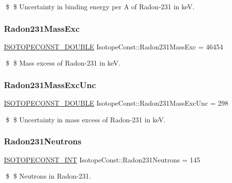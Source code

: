 \$ \$ Uncertainty in binding energy per A of Radon-\/231 in keV. \mbox{\label{group___isotope_const-_radon-_rn231_ga50596ab8955d3dfaba32bcaf6edc9448}} 
\subsubsection{\texorpdfstring{Radon231\+Mass\+Exc}{Radon231MassExc}}
{\footnotesize\ttfamily \mbox{\hyperlink{group___isotope_const-_macros_ga8f45a7272ce02c0b4c65c44636ed719a}{I\+S\+O\+T\+O\+P\+E\+C\+O\+N\+S\+T\+\_\+\+D\+O\+U\+B\+LE}} Isotope\+Const\+::\+Radon231\+Mass\+Exc = 46454}

\$ \$ Mass excess of Radon-\/231 in keV. \mbox{\label{group___isotope_const-_radon-_rn231_ga15a19c8c958a46d086783b2398a66455}} 
\subsubsection{\texorpdfstring{Radon231\+Mass\+Exc\+Unc}{Radon231MassExcUnc}}
{\footnotesize\ttfamily \mbox{\hyperlink{group___isotope_const-_macros_ga8f45a7272ce02c0b4c65c44636ed719a}{I\+S\+O\+T\+O\+P\+E\+C\+O\+N\+S\+T\+\_\+\+D\+O\+U\+B\+LE}} Isotope\+Const\+::\+Radon231\+Mass\+Exc\+Unc = 298}

\$ \$ Uncertainty in mass excess of Radon-\/231 in keV. \mbox{\label{group___isotope_const-_radon-_rn231_ga33d762eff88bda4afc92c20aa36709a9}} 
\subsubsection{\texorpdfstring{Radon231\+Neutrons}{Radon231Neutrons}}
{\footnotesize\ttfamily \mbox{\hyperlink{group___isotope_const-_macros_ga5f18360b3e99483a35c32d789e62621c}{I\+S\+O\+T\+O\+P\+E\+C\+O\+N\+S\+T\+\_\+\+I\+NT}} Isotope\+Const\+::\+Radon231\+Neutrons = 145}

\$ \$ Neutrons in Radon-\/231. \mbox{\label{group___isotope_const-_radon-_rn231_ga5c6e9939d20c6eb989060b3f87d190bc}} 
